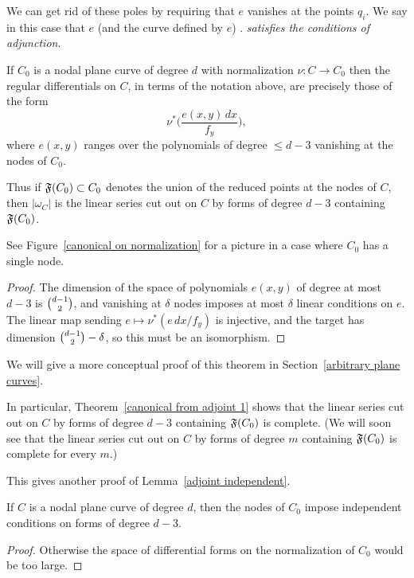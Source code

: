We can get rid of these poles by requiring that $e$ vanishes at the
points $q_i$. We say in this case that $e$ (and the curve defined by $e$)
 .
\emph{satisfies the conditions of adjunction}.

\begin{theorem}\label{canonical from adjoint 1}
If $C_{0}$ is a nodal plane curve of degree $d$ with normalization $\nu:
C\to C_{0}$
then the  regular differentials on  $C$, in terms of the notation above,
 are precisely those of the form
 $$
\nu^{*}\biggl( \frac{e(x,y)\,dx}{f_{y}}\biggr)
,
$$
where
$e(x,y)$ ranges over the polynomials of degree $\leq d-3$
vanishing at the nodes of $C_{0}$.

Thus if $\adj(C_{0})\subset C_{0}$ denotes the union
of the reduced points at the nodes of $C$, then $|\omega_{C}|$ is the
linear series cut out on $C$ by
forms of degree $d-3$ containing $\adj(C_{0})$.
\unif
\end{theorem}

See Figure~\ref{canonical on normalization} for a picture in a case
where $C_0$ has a single node.
\begin{proof}
The dimension of the space of polynomials $e(x,y)$ of degree at most
$d-3$ is $\tbinom{d-1}{2}$,
and vanishing at $\delta$ nodes imposes at most $\delta$ linear conditions
on $e$. The linear map sending
$e\mapsto \nu^{*}(e\,dx/f_{y})$ is injective, and the target has dimension
$\tbinom{d-1}{2}-\delta$, so this must be an isomorphism.
\end{proof}
We will give a more conceptual proof of this theorem in
Section~\ref{arbitrary plane curves}.

In particular, Theorem~\ref{canonical from adjoint 1}
shows that the linear series cut out on $C$ by
forms of degree $d-3$ containing $\adj(C_{0})$ is complete. (We will
soon see that
 the linear series cut out on $C$ by
forms of degree $m$ containing $\adj(C_{0})$ is complete for every $m$.)


This gives another proof of Lemma~\ref{adjoint independent}.

\begin{corollary}
If $C$ is a nodal plane curve of degree $d$, then the nodes of $C_{0}$
impose independent
%
conditions on forms of degree $d-3$.
\unif
\end{corollary}

\begin{proof}
 Otherwise the space of differential forms on the normalization of $C_{0}$
 would be too large.
\end{proof}

